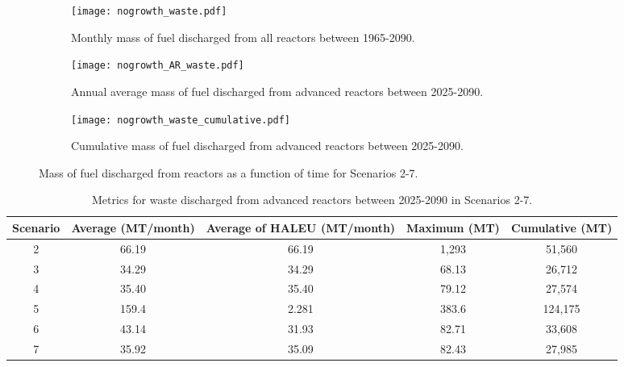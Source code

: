 \begin{figure}
    \centering
    \begin{subfigure}[b]{0.45\textwidth}
        \centering
        \texttt{[image: nogrowth\_waste.pdf]}
        \caption{Monthly mass of fuel discharged from all reactors 
        between 1965-2090.}
        \label{fig:nogrowth_all_waste}
    \end{subfigure}
    \hfill
    \begin{subfigure}[b]{0.45\textwidth}
        \centering
        \texttt{[image: nogrowth\_AR\_waste.pdf]}
        \caption{Annual average mass of fuel discharged from 
        advanced reactors between 2025-2090.}
        \label{fig:nogrowth_AR_waste}
    \end{subfigure}
    \begin{subfigure}[b]{0.45\textwidth}
        \centering
        \texttt{[image: nogrowth\_waste\_cumulative.pdf]}
        \caption{Cumulative mass of fuel discharged from advanced reactors 
        between 2025-2090.}
        \label{fig:nogrowth_waste_cumulative}
    \end{subfigure}
       \caption{Mass of fuel discharged from reactors 
       as a function of time for Scenarios 2-7. }
       \label{fig:nogrowth_waste}
\end{figure}

\begin{table}
    \centering 
    \caption{Metrics for waste discharged from advanced reactors 
    between 2025-2090 in Scenarios 2-7.}
    \label{tab:nogrowth_waste}
    \begin{tabular}{c c c c c}
        \hline
        Scenario & Average (MT/month) & Average of \gls{HALEU} 
        (MT/month) & Maximum (MT) & Cumulative (MT)\\\hline
        2 & 66.19 & 66.19 & 1,293 & 51,560\\
        3 & 34.29 & 34.29 & 68.13 & 26,712\\
        4 & 35.40 & 35.40 & 79.12 & 27,574\\
        5 & 159.4 & 2.281 & 383.6 & 124,175\\
        6 & 43.14 & 31.93 & 82.71 & 33,608\\
        7 & 35.92 & 35.09 & 82.43 & 27,985\\
        \hline
    \end{tabular}
\end{table}

